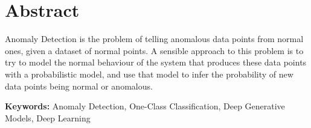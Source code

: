 \section*{Abstract}


Anomaly Detection is the problem of telling anomalous data points from normal
ones, given a dataset of normal points. A sensible approach to this problem is
to try to model the normal behaviour of the system that produces these data
points with a probabilistic model, and use that model to infer the probability
of new data points being normal or anomalous. 

\vfill

\textbf{\Large Keywords:} Anomaly Detection, One-Class Classification, Deep
Generative Models, Deep Learning

